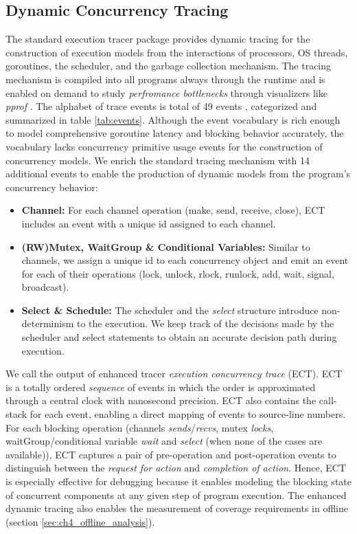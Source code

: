 \subsection{Dynamic Concurrency Tracing}
\label{sec:ch4_dynamic_tracing}
The standard execution tracer package \cite{go-package-trace,go-cmd-trace} provides dynamic tracing for the construction of execution models from the interactions of processors, OS threads, goroutines, the scheduler, and the garbage collection mechanism.
%
The tracing mechanism is compiled into all programs always through the runtime and is enabled on demand to study \textit{perfromance bottlenecks} through visualizers like \textit{pprof} \cite{go-profile-blog}.
%
The alphabet of trace events is total of 49 events \cite{goParserSource}, categorized and summarized in table \ref{tab:events}.
%
Although the event vocabulary is rich enough to model comprehensive goroutine latency and blocking behavior accurately,
the vocabulary lacks concurrency primitive usage events for the construction of concurrency models.
%
We enrich the standard tracing mechanism with 14 additional events to enable the production of dynamic models from the program's concurrency behavior:
\begin{itemize}
    \item \textbf{Channel:} For each channel operation (make, send, receive, close), ECT includes an event with a unique id assigned to each channel.
    \item \textbf{(RW)Mutex, WaitGroup \& Conditional Variables:} Similar to channels, we assign a unique id to each concurrency object and emit an event for each of their operations (lock, unlock, rlock, runlock, add, wait, signal, broadcast).
    \item \textbf{Select \& Schedule:} The scheduler and the \textit{select} structure introduce non-determinism to the execution. We keep track of the decisions made by the scheduler and select statements to obtain an accurate decision path during execution.
\end{itemize}

We call the output of enhanced tracer \textit{execution concurrency trace} (ECT).
%
ECT is a totally ordered \textit{sequence} of events in which the order is approximated through a central clock with nanosecond precision.
%
ECT also contains the call-stack for each event, enabling a direct mapping of events to source-line numbers.
%
For each blocking operation (channels \textit{sends}/\textit{recvs}, mutex \textit{locks}, waitGroup/conditional variable \textit{wait} and \textit{select} (when none of the cases are available)), ECT captures a pair of pre-operation and post-operation events to distinguish between the \textit{request for action} and \textit{completion of action}.
%
Hence, ECT is especially effective for debugging because it enables modeling the blocking state of concurrent components at any given step of program execution.
%
The enhanced dynamic tracing also enables the measurement of coverage requirements in offline (section \ref{sec:ch4_offline_analysis}).

